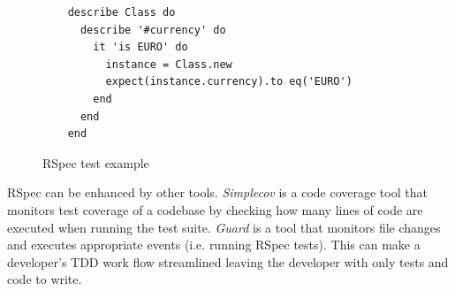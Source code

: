 \begin{figure}
  \begin{verbatim}
    describe Class do
      describe '#currency' do
        it 'is EURO' do
          instance = Class.new
          expect(instance.currency).to eq('EURO')
        end
      end
    end
  \end{verbatim}
  \caption{
    RSpec test example
    \label{figure:rspec}
  }
\end{figure}

RSpec can be enhanced by other tools. \textit{Simplecov} \parencite{Simplecov}
is a code coverage tool that monitors test coverage of a codebase by checking
how many lines of code are executed when running the test suite. \textit{Guard}
\parencite{Guard} is a tool that monitors file changes and executes appropriate
events (i.e. running RSpec tests). This can make a developer's TDD work flow
streamlined leaving the developer with only tests and code to write.
